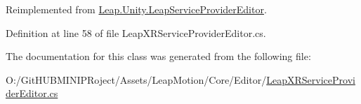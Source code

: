 Reimplemented from \mbox{\hyperlink{class_leap_1_1_unity_1_1_leap_service_provider_editor_a25d4ecd6fae74e7fd8bf6d358fe93568}{Leap.\+Unity.\+Leap\+Service\+Provider\+Editor}}.



Definition at line 58 of file Leap\+X\+R\+Service\+Provider\+Editor.\+cs.



The documentation for this class was generated from the following file\+:\begin{DoxyCompactItemize}
\item 
O\+:/\+Git\+H\+U\+B\+M\+I\+N\+I\+P\+Roject/\+Assets/\+Leap\+Motion/\+Core/\+Editor/\mbox{\hyperlink{_leap_x_r_service_provider_editor_8cs}{Leap\+X\+R\+Service\+Provider\+Editor.\+cs}}\end{DoxyCompactItemize}
